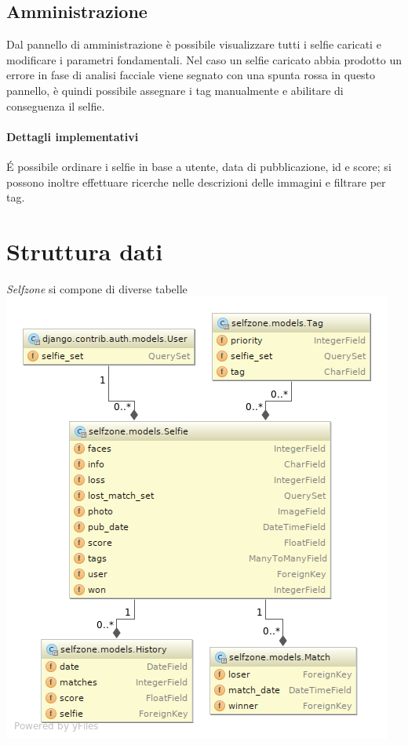 \documentclass{article}
\newcommand{\proj}{\textit{Selfzone }}
\begin{document}
\subsection{Amministrazione}
Dal pannello di amministrazione è possibile visualizzare tutti i selfie caricati e modificare i parametri fondamentali. Nel caso un selfie caricato abbia prodotto un errore in fase di analisi facciale viene segnato con una spunta rossa in questo pannello, è quindi possibile assegnare i tag manualmente e abilitare di conseguenza il selfie.

\paragraph{Dettagli implementativi}
\'E possibile ordinare i selfie in base a utente, data di pubblicazione, id e score; si possono inoltre effettuare ricerche nelle descrizioni delle immagini e filtrare per tag.


\section{Struttura dati}
\proj si compone di diverse tabelle\\
\includegraphics[width=\textwidth]{res/models_diagram.png}
\clearpage
\end{document}
